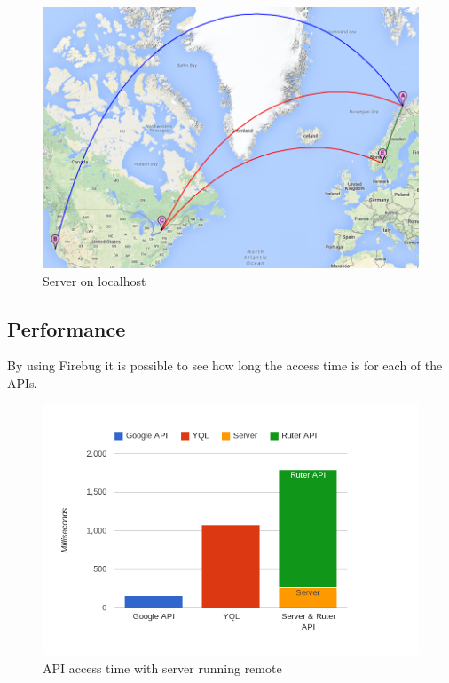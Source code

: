 \documentclass[10pt,a4paper]{article}
\begin{document}
\begin{figure}
\centering
\includegraphics[width=\textwidth]{../traceroute/localhost_markers}
\caption{Server on localhost}
\label{traceroute_localhost}
\end{figure}

\subsection{Performance}
By using Firebug it is possible to see how long the access time is for each of the APIs. 

\begin{figure}
\centering
\includegraphics[width=\textwidth]{../apitimes/apitiderHeroku}
\caption{API access time with server running remote}
\label{time_heroku}
\end{figure}
\end{document}
